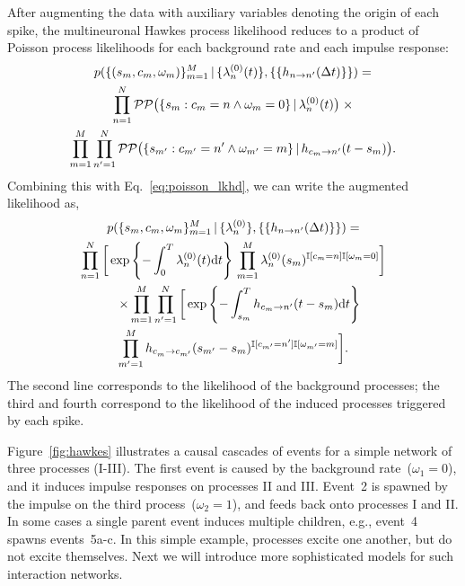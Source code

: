 After augmenting the data with auxiliary variables denoting the origin
of each spike, the multineuronal Hawkes process likelihood reduces to 
a product of Poisson process likelihoods for each background rate and 
each impulse response:
\begin{multline*}
  p(\{(s_m,c_m,\omega_m)\}_{m=1}^M \,|\, 
  \{\lambda^{(0)}_{n}(t)\}, \{\{h_{n \to n'}(\Delta t)\}\}) = \\
  \prod_{n=1}^N \mathcal{PP} \big(\{s_{m}: c_{m}=n \wedge \omega_{m}=0\} \,|\, \lambda^{(0)}_{n}(t) \big) \; \times\\
  \prod_{m=1}^M \prod_{n'=1}^N \mathcal{PP} \big(\{s_{m'}: c_{m'}=n' \wedge \omega_{m'}=m\} \,|\, h_{c_m \to n'}(t-s_m) \big).
\end{multline*}
Combining this with 
Eq.~\ref{eq:poisson_lkhd}, we can
write the augmented likelihood as,
\begin{multline}
  \label{eq:hawkes_likelihood}
  p(\{s_m, c_m, \omega_m\}_{m=1}^M \,|\, \{\lambda^{(0)}_{n}\}, \{\{h_{n \to n'}(\Delta t)\}\}) = \\
  \prod^N_{n=1} \bigg[
  \exp\left\{ -\int_0^T \lambda^{(0)}_{n}(t)\mathrm{d}t \right\} \,
  \prod^M_{m=1}
   \lambda^{(0)}_{n}(s_m)^{\mathbb{I}[c_m=n] \mathbb{I}[\omega_m = 0]} \bigg]\\
  \quad\times \prod_{m=1}^M \prod_{n'=1}^N \bigg[
  \exp\left\{-\int^T_{s_m} h_{c_m \to n'}(t - s_m) \mathrm{d}t \right\} \\
  \prod_{m'=1}^M h_{c_m^{~} \to c_{m'}}(s_{m'}-s_m)^{\mathbb{I}[c_{m'}=n'] \mathbb{I}[\omega_{m'}=m]}\bigg].
\end{multline}
The second line corresponds to the likelihood of the background
processes; the third and fourth correspond to the likelihood of the
induced processes triggered by each spike.

Figure~\ref{fig:hawkes} illustrates a causal cascades of events for a
simple network of three processes (I-III).  The first event is caused
by the background rate~(${\omega_1=0}$), and it induces impulse responses
on processes II and III. Event~2 is spawned by the impulse on the
third process~(${\omega_2=1}$), and feeds back onto processes I and II. In
some cases a single parent event induces multiple children, e.g.,
event~4 spawns events~{5a-c}. In this simple example, processes excite
one another, but do not excite themselves. Next we will introduce more
sophisticated models for such interaction networks.

